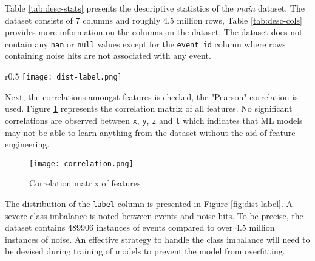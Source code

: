 Table \ref{tab:desc-stats} presents the descriptive statistics of the
\emph{main} dataset. The dataset consists of 7 columns and roughly 4.5 million
rows, Table \ref{tab:desc-cols} provides more information on the columns on the
dataset. The dataset does not contain any \texttt{nan} or \texttt{null} values
except for the \texttt{event\_id} column where rows containing noise hits are
not associated with any event.

\begin{wrapfigure}{r}{0.5\textwidth}
  \centering
  \texttt{[image: dist-label.png]}
  \caption{Distribution of \texttt{label} column}%
  \label{fig:dist-label}
\end{wrapfigure}

Next, the correlations amongst features is checked, the "Pearson"
correlation is used. Figure \ref{fig:corr} represents the correlation
matrix of all features. No significant correlations are observed
between \texttt{x}, \texttt{y}, \texttt{z} and \texttt{t} which
indicates that ML models may not be able to learn anything from the
dataset without the aid of feature engineering.

\begin{figure}[h]
  \centering
  \texttt{[image: correlation.png]}
  \caption{Correlation matrix of features}
  \label{fig:corr}
\end{figure}

The distribution of the \texttt{label} column is presented in Figure
\ref{fig:dist-label}. A severe class imbalance is noted between events and
noise hits. To be precise, the dataset contains 489906 instances of events
compared to over 4.5 million instances of noise. An effective strategy to
handle the class imbalance will need to be devised during training of models
to prevent the model from overfitting.

